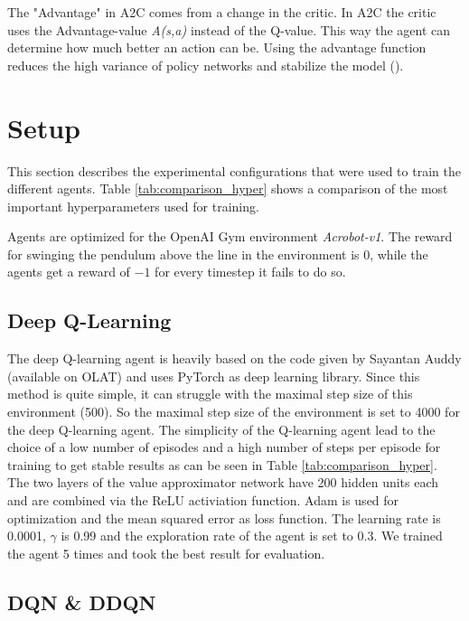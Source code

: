\documentclass[11pt,a4paper]{article}
\begin{document}
The "Advantage" in A2C comes from a change in the critic. In A2C the critic uses the Advantage-value \textit{A(s,a)} instead of the Q-value. This way the agent can determine how much better an action can be. Using the advantage function reduces the high variance of policy networks and stabilize the model (\cite{actorCritics}).\\ 


\section{Setup}
\label{sec:setup}
This section describes the experimental configurations that were used to train the different agents. Table \ref{tab:comparison_hyper} shows a comparison of the most important hyperparameters used for training.

Agents are optimized for the OpenAI Gym environment \textit{Acrobot-v1}. The reward for swinging the pendulum above the line in the environment is $0$, while the agents get a reward of $-1$ for every timestep it fails to do so.

\subsection{Deep Q-Learning}

The deep Q-learning agent is heavily based on the code given by Sayantan Auddy (available on OLAT) and uses PyTorch as deep learning library. Since this method is quite simple, it can struggle with the maximal step size of this environment (500). So the maximal step size of the environment is set to 4000 for the deep Q-learning agent. The simplicity of the Q-learning agent lead to the choice of a low number of episodes and a high number of steps per episode for training to get stable results as can be seen in Table \ref{tab:comparison_hyper}. The two layers of the value approximator network have 200 hidden units each and are combined via the ReLU activiation function. Adam is used for optimization and the mean squared error as loss function. The learning rate is 0.0001, $\gamma$ is 0.99 and the exploration rate of the agent is set to 0.3. We trained the agent 5 times and took the best result for evaluation.

\subsection{DQN \& DDQN}
\end{document}
